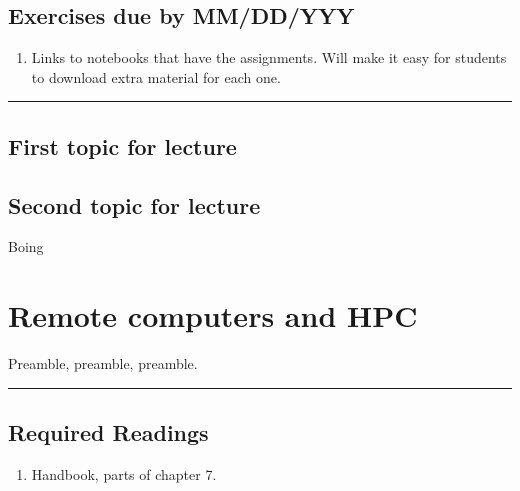 \documentclass[]{book}
\providecommand{\tightlist}{%
  \setlength{\itemsep}{0pt}\setlength{\parskip}{0pt}}
\begin{document}
\hypertarget{exercises-due-by-mmddyyy-3}{%
\section*{Exercises due by MM/DD/YYY}\label{exercises-due-by-mmddyyy-3}}

\begin{enumerate}
\def\labelenumi{\arabic{enumi}.}
\tightlist
\item
  Links to notebooks that have the assignments. Will make it
  easy for students to download extra material for each one.
\end{enumerate}

\begin{center}\rule{0.5\linewidth}{\linethickness}\end{center}

\hypertarget{first-topic-for-lecture-2}{%
\section{First topic for lecture}\label{first-topic-for-lecture-2}}

\hypertarget{second-topic-for-lecture-2}{%
\section{Second topic for lecture}\label{second-topic-for-lecture-2}}

Boing

\hypertarget{remote-computers-and-hpc}{%
\chapter{Remote computers and HPC}\label{remote-computers-and-hpc}}

Preamble, preamble, preamble.

\begin{center}\rule{0.5\linewidth}{\linethickness}\end{center}

\hypertarget{required-readings-4}{%
\section*{Required Readings}\label{required-readings-4}}

\begin{enumerate}
\def\labelenumi{\arabic{enumi}.}
\tightlist
\item
  Handbook, parts of chapter 7.
\end{enumerate}
\end{document}
